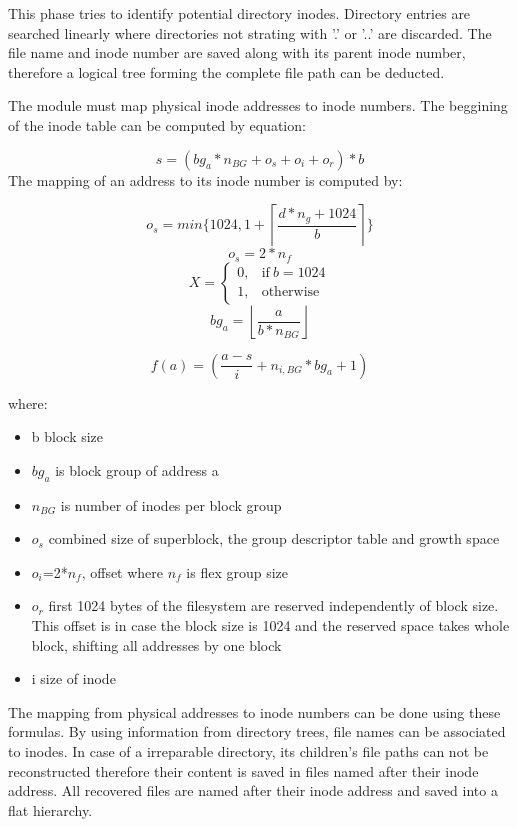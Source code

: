 \documentclass{acm_proc_article-sp}
\begin{document}
\begin{enumerate}
This phase tries to identify potential directory inodes. Directory entries are searched linearly where directories not strating with '.' or '..' are discarded. The file name and inode number are saved along with its parent inode number, therefore a logical tree forming the complete file path can be deducted.

The module must map physical inode addresses to inode numbers. The beggining of the inode table can be computed by equation:

\[s=(bg_a * n_{BG} +o_s + o_i +o_r)*b  \]
The mapping of an address to its inode number is computed by:

\[o_s=min \{1024, 1+ \left\lceil \frac{d*n_g+1024}{b} \right\rceil \} \]
\[ o_s=2*n_f\]
\begin{equation}
  X=
  \begin{cases}
    0, & \text{if}\ b=1024 \\
    1, & \text{otherwise}
  \end{cases}
\end{equation}
\[bg_a=\left\lfloor \frac{a}{b*n_{BG}} \right\rfloor \]

\[f(a)=(\frac{a-s}{i} +n_{i,BG} *bg_a +1) \]

where:
\begin{itemize}
\item b block size

\item $bg_a$ is block group of address a

\item $n_{BG}$ is number of inodes per block group

\item $o_s$ combined size of superblock, the group descriptor table and growth space

\item $o_i$=2*$n_f$, offset where $n_f$ is flex group size

\item $o_r$ first 1024 bytes of the filesystem are reserved independently of block size. This offset is in case the block size is 1024 and the reserved space takes whole block, shifting all addresses by one block 

\item i size of inode 
\end{itemize}

The mapping from physical addresses to inode numbers can be done using these formulas. By using information from directory trees, file names can be associated to inodes. In case of a irreparable directory, its children's file paths can not be reconstructed therefore their content is saved in files named after their inode address. All recovered files are named after their inode address and saved into a flat hierarchy.




\end{enumerate}
\end{document}

